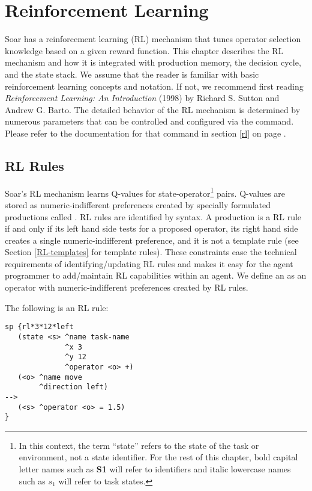 \chapter{Reinforcement Learning}
\label{RL}

Soar has a reinforcement learning (RL) mechanism that tunes operator selection knowledge based on a given reward function.
This chapter describes the RL mechanism and how it is integrated with production memory, the decision cycle, and the state stack.
We assume that the reader is familiar with basic reinforcement learning concepts and notation. If not, we recommend first reading \emph{Reinforcement Learning: An Introduction} (1998) by Richard S. Sutton and Andrew G. Barto.
The detailed behavior of the RL mechanism is determined by numerous parameters that can be controlled and configured via the  command.
Please refer to the documentation for that command in section \ref{rl} on page \pageref{rl}.

\section{RL Rules}
\label{RL-rules}

Soar's RL mechanism learns Q-values for state-operator\footnote{
	In this context, the term ``state'' refers to the state of the task or environment, not a state identifier.
	For the rest of this chapter, bold capital letter names such as \textbf{S1} will refer to identifiers and italic lowercase names such as $s_1$ will refer to task states.}
pairs.
Q-values are stored as numeric-indifferent preferences created by specially formulated productions called .
RL rules are identified by syntax.
A production is a RL rule if and only if its left hand side tests for a proposed operator, its right hand side creates a single numeric-indifferent preference, and it is not a template rule (see Section \ref{RL-templates} for template rules).
These constraints ease the technical requirements of identifying/updating RL rules and makes it easy for the agent programmer to add/maintain RL capabilities within an agent.
We define an  as an operator with numeric-indifferent preferences created by RL rules.

The following is an RL rule:

\begin{verbatim}
sp {rl*3*12*left
   (state <s> ^name task-name
              ^x 3
              ^y 12
              ^operator <o> +)
   (<o> ^name move
        ^direction left)
-->
   (<s> ^operator <o> = 1.5)
}
\end{verbatim}

